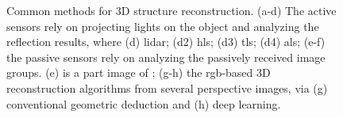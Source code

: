 \begin{figure}[htb!]
  \begin{center}
  \end{center}
  \caption[Common methods for 3D structure reconstruction]{
    Common methods for 3D structure reconstruction. (a-d) The active sensors rely on projecting lights on the object and analyzing the reflection results, where (d) \acrfull{lidar}; (d2) \acrfull{hls}; (d3) \acrfull{tls}; (d4) \acrfull{als}; (e-f) the passive sensors rely on analyzing the passively received image groups. (e) is a part image of \citep[Fig.~6]{schima_imagine_2016}; (g-h) the \gls{rgb}-based 3D reconstruction algorithms from several perspective images, via (g) conventional geometric deduction and (h) deep learning.
  }
  \label{fig:int2}
\end{figure}